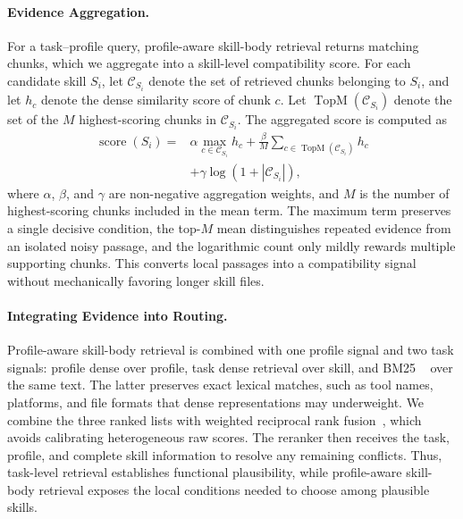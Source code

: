 \documentclass[letterpaper]{article} %
\begin{document}

\paragraph{Evidence Aggregation.}
For a task--profile query, profile-aware skill-body retrieval returns matching chunks, which we aggregate into a skill-level compatibility score.
For each candidate skill $S_i$, let $\mathcal{C}_{S_i}$ denote the set of
retrieved chunks belonging to $S_i$, and let $h_c$ denote the dense similarity
score of chunk $c$.
Let $\operatorname{TopM}(\mathcal{C}_{S_i})$ denote the set of the $M$
highest-scoring chunks in $\mathcal{C}_{S_i}$. The aggregated score is
computed as 
\begin{equation}
\begin{aligned}
\operatorname{score}(S_i)
={}&
\alpha
\max_{c\in\mathcal{C}_{S_i}} h_c
+
\frac{\beta}{M}
\sum_{c\in\operatorname{TopM}(\mathcal{C}_{S_i})} h_c \\
&+
\gamma
\log\!\left(1+\left|\mathcal{C}_{S_i}\right|\right),
\end{aligned}
\label{eq:chunk_to_skill_aggregation}
\end{equation}
where $\alpha$, $\beta$, and $\gamma$ are non-negative aggregation weights, and $M$ is the number of highest-scoring chunks included in the mean term. The maximum term preserves a single decisive condition, the top-$M$ mean distinguishes repeated evidence from an isolated noisy passage, and the logarithmic count only mildly rewards multiple supporting chunks. This converts local passages into a compatibility signal without mechanically favoring longer skill files.

\paragraph{Integrating Evidence into Routing.}
Profile-aware skill-body retrieval is combined with one profile signal and two task signals: profile dense over profile, task dense retrieval over skill, and BM25 ~\citep{robertson2009bm25} over the same text. The latter preserves exact lexical matches, such as tool names, platforms, and file formats that dense representations may underweight. We combine the three ranked lists with weighted reciprocal rank fusion~\citep{cormack2009rrf}, which avoids calibrating heterogeneous raw scores. The reranker then receives the task, profile, and complete skill information to resolve any remaining conflicts. Thus, task-level retrieval establishes functional plausibility, while profile-aware skill-body retrieval exposes the local conditions needed to choose among plausible skills.
\end{document}
